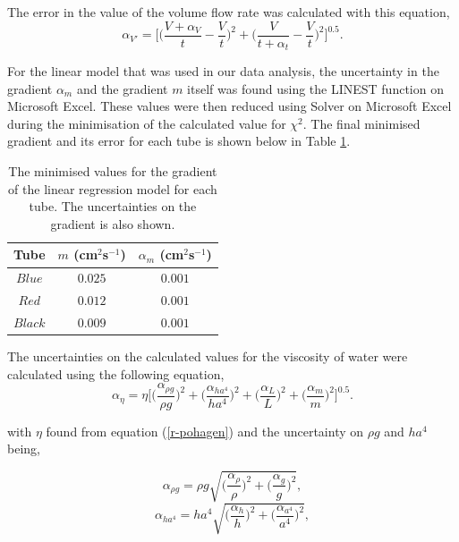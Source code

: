 \documentclass[twocolumn]{revtex4}
\begin{document}
The error in the value of the volume flow rate was calculated with this equation,
\begin{equation} 
\alpha_{V'} = \Bigg[ \Bigg( \frac{V+\alpha_{V}}{t} - \frac{V}{t} \Bigg)^2 + \Bigg( \frac{V}{t+\alpha_{t}} - \frac{V}{t} \Bigg)^2 \Bigg]^{0.5} .
\label{ea-volflow}
\end{equation}

For the linear model that was used in our data analysis, the uncertainty in the gradient $\alpha_m$ and the gradient $m$ itself was found using the LINEST function on Microsoft Excel. These values were then reduced using Solver on Microsoft Excel during the minimisation of the calculated value for $\chi^2$. The final minimised gradient and its error for each tube is shown below in Table \ref{table:2}.
\begin{table}[h!]
\centering
\begin{tabular}{ |c|c|c| } 
 \hline
 \textbf{Tube} & \textbf{$m$ (cm$^{2}$s$^{-1}$)} & \textbf{$\alpha_m$ (cm$^{2}$s$^{-1}$)} \\ [0.5ex] 
 \hline
 $Blue$ &$0.025$ & $0.001$ \\ 
 $Red$ & $0.012$ & $0.001$ \\
 $Black$ & $0.009$ & $0.001$ \\ 
\hline
\end{tabular}
\caption{The minimised values for the gradient of the linear regression model for each tube. The uncertainties on the gradient is also shown.}
\label{table:2}
\end{table}

The uncertainties on the calculated values for the viscosity of water were calculated using the following equation,
\small
\begin{equation} 
\alpha_{\eta} = \eta \Bigg[ \Bigg( \frac{\alpha_{\rho g}}{\rho g} \Bigg)^2 + \Bigg( \frac{\alpha_{ha^4}}{ha^4} \Bigg)^2 + \Bigg( \frac{\alpha_{L}}{L} \Bigg)^2 + \Bigg( \frac{\alpha_{m}}{m} \Bigg)^2 \Bigg]^{0.5}.
\label{ea-viscos}
\end{equation}
\normalsize

with $\eta$ found from equation (\ref{r-pohagen}) and the uncertainty on $\rho g$ and $ha^4$ being,

\begin{equation} 
\alpha_{\rho g} = \rho g \sqrt{ \Bigg( \frac{\alpha_{\rho}}{\rho} \Bigg)^2 + \Bigg( \frac{\alpha_{g}}{g} \Bigg)^2 }, 
\label{ea-rhog}
\end{equation}
\begin{equation} 
\alpha_{ha^4} = ha^4 \sqrt{ \Bigg( \frac{\alpha_{h}}{h} \Bigg)^2 + \Bigg( \frac{\alpha_{a^4}}{a^4} \Bigg)^2 }, 
\label{ea-hafour}
\end{equation}
\end{document}
